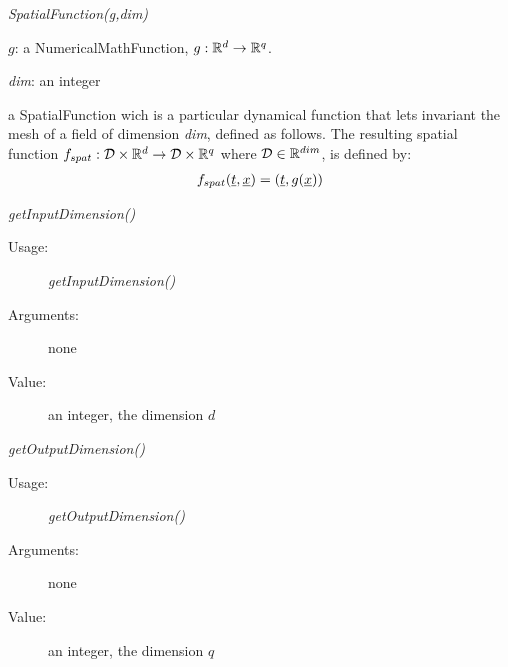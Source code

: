 \begin{description}

\item[Usage:]    \textit{SpatialFunction(g,dim)}

\item[Arguments:]
\begin{description}
\item $g$: a NumericalMathFunction, $g : {\mathbb R}^d  \rightarrow {\mathbb R}^q$.
\item \textit{dim}: an integer
\end{description}


\item[Value:] a SpatialFunction wich  is a particular dynamical function that lets invariant the mesh of a field of dimension \textit{dim}, defined as follows.  The resulting  spatial function $f_{spat}: {\mathcal D} \times {\mathbb R}^d \rightarrow {\mathcal D} \times {\mathbb R}^q$ where ${\mathcal D} \in {\mathbb R}^{dim}$, is defined by:
\begin{align}\label{spatFunc}
f_{spat}({\underline{t}}, {\underline{x}})=({\underline{t}}, g({\underline{x}}))
\end{align}

\item[Some methods:]  \rule{0pt}{1em}
\begin{description}

\item \textit{getInputDimension()}
\begin{description}
\item[Usage:] \textit{getInputDimension()}
\item[Arguments:] none
\item[Value:] an integer, the dimension $d$
\end{description}
\bigskip

\item \textit{getOutputDimension()}
\begin{description}
\item[Usage:] \textit{getOutputDimension()}
\item[Arguments:] none
\item[Value:] an integer, the dimension $q$
\end{description}
\bigskip



\end{description}
\end{description}

\newpage


